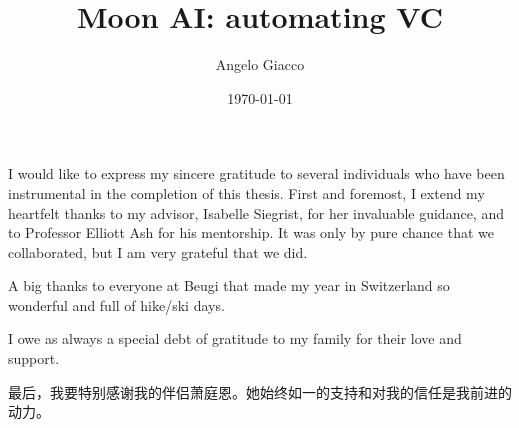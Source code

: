 \documentclass[a4paper, oneside]{discothesis}
\title{Moon AI: automating VC}
\author{Angelo Giacco}
\institute{ETH AI Centre \\[2pt]
ETH Zürich}
\date{\today}
\begin{document}
\frontmatter %
\maketitle

\cleardoublepage

\begin{acknowledgements}
	I would like to express my sincere gratitude to several individuals who have been instrumental in the completion of this thesis. First and foremost, I extend my heartfelt thanks to my advisor, Isabelle Siegrist, for her invaluable guidance, and to Professor Elliott Ash for his mentorship. It was only by pure chance that we collaborated, but I am very grateful that we did.

A big thanks to everyone at Beugi that made my year in Switzerland so wonderful and full of hike/ski days.

I owe as always a special debt of gratitude to my family for their love and support.

    \begin{CJK*}{UTF8}{gbsn}
最后，我要特别感谢我的伴侣萧庭恩。她始终如一的支持和对我的信任是我前进的动力。\clearpage\end{CJK*}
\end{acknowledgements}
\end{document}
